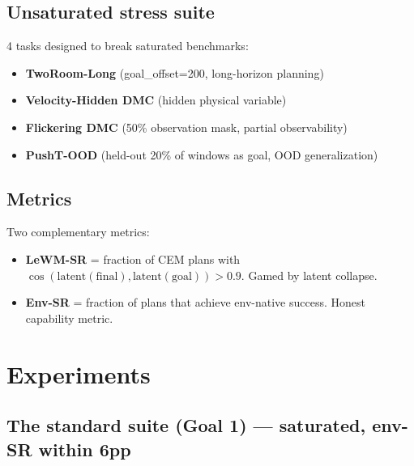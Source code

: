 \documentclass{article}
\begin{document}
\subsection{Unsaturated stress suite}
4 tasks designed to break saturated benchmarks:
\begin{itemize}
\item \textbf{TwoRoom-Long} (goal\_offset=200, long-horizon planning)
\item \textbf{Velocity-Hidden DMC} (hidden physical variable)
\item \textbf{Flickering DMC} (50\% observation mask, partial observability)
\item \textbf{PushT-OOD} (held-out 20\% of windows as goal, OOD generalization)
\end{itemize}

\subsection{Metrics}
Two complementary metrics:
\begin{itemize}
\item \textbf{LeWM-SR} = fraction of CEM plans with $\cos(\text{latent}(\text{final}), \text{latent}(\text{goal})) > 0.9$.
  Gamed by latent collapse.
\item \textbf{Env-SR} = fraction of plans that achieve env-native success.
  Honest capability metric.
\end{itemize}

\section{Experiments}

\subsection{The standard suite (Goal 1) — saturated, env-SR within 6pp}
\end{document}

